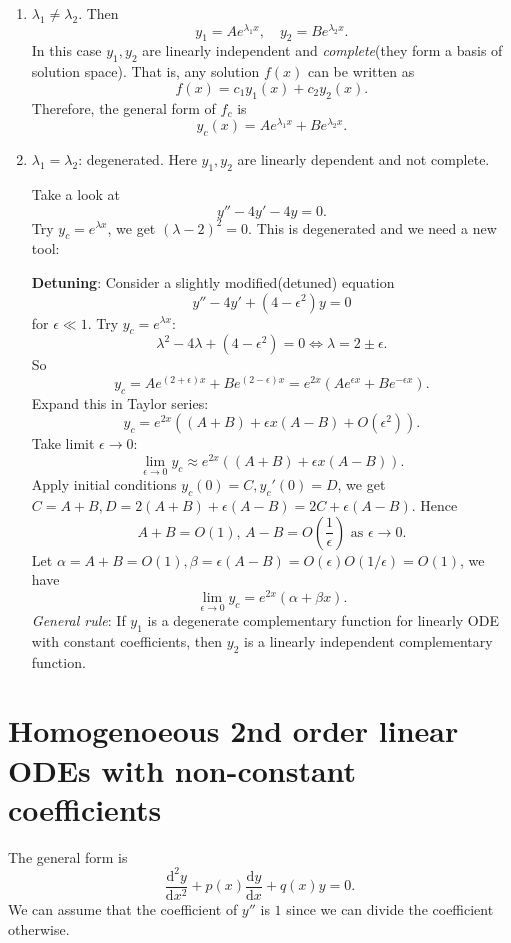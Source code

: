 \documentclass[10pt]{article}
\begin{document}
    \begin{enumerate}
        \item $ \lambda_1\neq \lambda_2$. Then
        \[
            y_1=Ae^{\lambda_1 x},\quad y_2=Be^{\lambda_2 x}
        .\]
        In this case $ y_1,y_2 $ are linearly independent and \textit{complete}(they form a basis of solution space). That is, any solution $f(x)$ can be written as 
        \[
            f(x)=c_1y_1(x)+c_2y_2(x)
        .\]
        Therefore, the general form of $f_c$ is 
        \[
            y_c(x)=Ae^{\lambda_1 x}+Be^{\lambda_2 x}
        .\]
        \item $ \lambda_1=\lambda_2 $: degenerated. Here $ y_1,y_2 $ are linearly dependent and not complete.
        \begin{example}
            Take a look at
            \[
                y''-4y'-4y=0
            .\]
            Try $ y_c=e^{\lambda x} $, we get $ (\lambda-2)^2=0 $. This is degenerated and we need a new tool:
        \end{example}
        \textbf{Detuning}: Consider a slightly modified(detuned) equation 
        \[
           y''-4y'+(4-\epsilon^2)y=0 
        \]
        for $ \epsilon\ll 1 $. Try $ y_c=e^{\lambda x} $:
        \[
            \lambda^2-4\lambda+(4-\epsilon^2)=0 \Longleftrightarrow \lambda=2\pm \epsilon
        .\]
        So
        \[
            y_c=Ae^{(2+\epsilon)x}+Be^{(2-\epsilon)x}=e^{2x}(Ae^{\epsilon x}+Be^{-\epsilon x})
        .\]
        Expand this in Taylor series:
        \[
            y_c=e^{2x}\left( (A+B)+\epsilon x(A-B)+O(\epsilon^2) \right)
        .\]
        Take limit $ \epsilon\to 0 $:
        \[
            \lim_{\epsilon \to 0} y_c \approx e^{2x}\left( (A+B)+\epsilon x(A-B) \right)
        .\]
        Apply initial conditions $ y_c(0)=C, y_c'(0)=D $, we get $ C=A+B, D=2(A+B)+\epsilon(A-B)=2C+\epsilon(A-B) $. Hence 
        \[
            A+B=O(1),\, A-B=O\left(\frac{1}{\epsilon}\right) \text{ as }\epsilon\to 0
        .\]
        Let $ \alpha=A+B=O(1), \beta=\epsilon(A-B)=O(\epsilon)O(1/\epsilon)=O(1) $, we have 
        \[
            \lim_{\epsilon \to 0} y_c=e^{2x}(\alpha+\beta x)
        .\]
        \textit{General rule}: If $y_1$ is a degenerate complementary function for linearly ODE with constant coefficients, then $ y_2 $ is a linearly independent complementary function.
    \end{enumerate}
    \section{Homogenoeous 2nd order linear ODEs with non-constant coefficients}
    The general form is 
    \begin{equation}\label{eq:2nd non-const}
        \frac{\mathrm{d}^2y}{\mathrm{d}x^2}+p(x)\frac{\mathrm{d}y}{\mathrm{d}x} +q(x)y=0.
    \end{equation}
    We can assume that the coefficient of $y''$ is $1$ since we can divide the coefficient otherwise.
\end{document}
